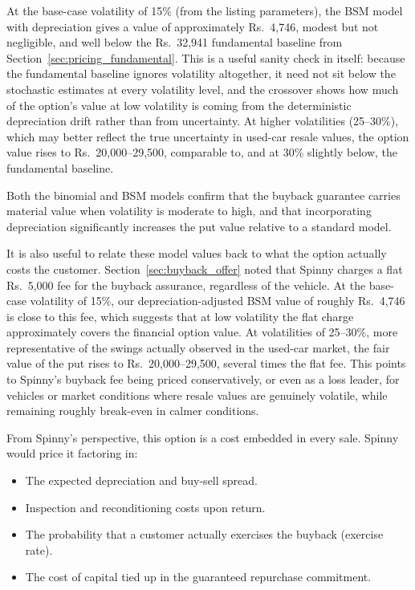 \documentclass[11pt, a4paper]{article}
\begin{document}
At the base-case volatility of 15\% (from the listing parameters), the BSM model with depreciation gives a value of approximately Rs.~4,746, modest but not negligible, and well below the Rs.~32,941 fundamental baseline from Section~\ref{sec:pricing_fundamental}. This is a useful sanity check in itself: because the fundamental baseline ignores volatility altogether, it need not sit below the stochastic estimates at every volatility level, and the crossover shows how much of the option's value at low volatility is coming from the deterministic depreciation drift rather than from uncertainty. At higher volatilities (25--30\%), which may better reflect the true uncertainty in used-car resale values, the option value rises to Rs.~20,000--29,500, comparable to, and at 30\% slightly below, the fundamental baseline.

Both the binomial and BSM models confirm that the buyback guarantee carries material value when volatility is moderate to high, and that incorporating depreciation significantly increases the put value relative to a standard model.

It is also useful to relate these model values back to what the option actually costs the customer. Section~\ref{sec:buyback_offer} noted that Spinny charges a flat Rs.~5,000 fee for the buyback assurance, regardless of the vehicle. At the base-case volatility of 15\%, our depreciation-adjusted BSM value of roughly Rs.~4,746 is close to this fee, which suggests that at low volatility the flat charge approximately covers the financial option value. At volatilities of 25--30\%, more representative of the swings actually observed in the used-car market, the fair value of the put rises to Rs.~20,000--29,500, several times the flat fee. This points to Spinny's buyback fee being priced conservatively, or even as a loss leader, for vehicles or market conditions where resale values are genuinely volatile, while remaining roughly break-even in calmer conditions.

From Spinny's perspective, this option is a cost embedded in every sale. Spinny would price it factoring in:
\begin{itemize}
    \item The expected depreciation and buy-sell spread.
    \item Inspection and reconditioning costs upon return.
    \item The probability that a customer actually exercises the buyback (exercise rate).
    \item The cost of capital tied up in the guaranteed repurchase commitment.
\end{itemize}
\end{document}
